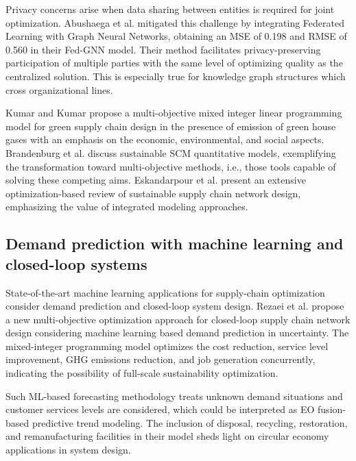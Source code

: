 \documentclass[conference]{IEEEtran}
\begin{document}
Privacy concerns arise when data sharing between entities is required for joint optimization. Abushaega et al. \cite{abushaega2025multiobjective} mitigated this challenge by integrating Federated Learning with Graph Neural Networks, obtaining an MSE of 0.198 and RMSE of 0.560 in their Fed-GNN model. Their method facilitates privacy-preserving participation of multiple parties with the same level of optimizing quality as the centralized solution. This is especially true for knowledge graph structures which cross organizational lines.

Kumar and Kumar \cite{kumar2024multiobjective} propose a multi-objective mixed integer linear programming model for green supply chain design in the presence of emission of green house gases with an emphasis on the economic, environmental, and social aspects. Brandenburg et al. \cite{brandenburg2014quantitative} discuss sustainable SCM quantitative models, exemplifying the transformation toward multi-objective methods, i.e., those tools capable of solving these competing aims. Eskandarpour et al. \cite{eskandarpour2015sustainable} present an extensive optimization-based review of sustainable supply chain network design, emphasizing the value of integrated modeling approaches.

\subsection{Demand prediction with machine learning and closed-loop systems}
State-of-the-art machine learning applications for supply-chain optimization consider demand prediction and closed-loop system design. Rezaei et al. \cite{rezaei2025multiobjective} propose a new multi-objective optimization approach for closed-loop supply chain network design considering machine learning based demand prediction in uncertainty. The mixed-integer programming model optimizes the cost reduction, service level improvement, GHG emissions reduction, and job generation concurrently, indicating the possibility of full-scale sustainability optimization.

Such ML-based forecasting methodology treats unknown demand situations and customer services levels are considered, which could be interpreted as EO fusion-based predictive trend modeling. The inclusion of disposal, recycling, restoration, and remanufacturing facilities in their model sheds light on circular economy applications in system design.
\end{document}
